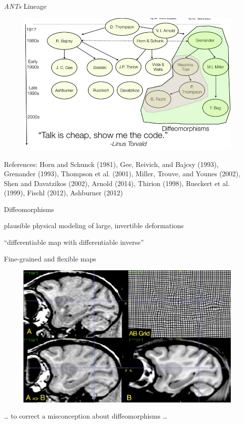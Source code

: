\documentclass[ignorenonframetext,]{beamer}
\begin{document}
\begin{frame}{\emph{ANTs} Lineage}

\begin{figure}[htbp]
\centering
\includegraphics{./figures/lineage.jpg}
\caption{}
\end{figure}

References: Horn and Schunck (1981), Gee, Reivich, and Bajcsy (1993),
Grenander (1993), Thompson et al. (2001), Miller, Trouve, and Younes
(2002), Shen and Davatzikos (2002), Arnold (2014), Thirion (1998),
Rueckert et al. (1999), Fischl (2012), Ashburner (2012)

\end{frame}

\begin{frame}{Diffeomorphisms}

plausible physical modeling of large, invertible deformations

``differentiable map with differentiable inverse''

\end{frame}

\begin{frame}{Fine-grained and flexible maps}

\begin{figure}[htbp]
\centering
\includegraphics{./figures/highresdiffeos.jpg}
\caption{}
\end{figure}

\ldots{} to correct a misconception about diffeomorphisms \ldots{}

\end{frame}
\end{document}
